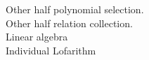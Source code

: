 \documentclass[preview]{standalone}
\begin{document}
Other half polynomial selection.\\Other half relation collection.\\Linear algebra\\Individual Lofarithm\\
\end{document}
